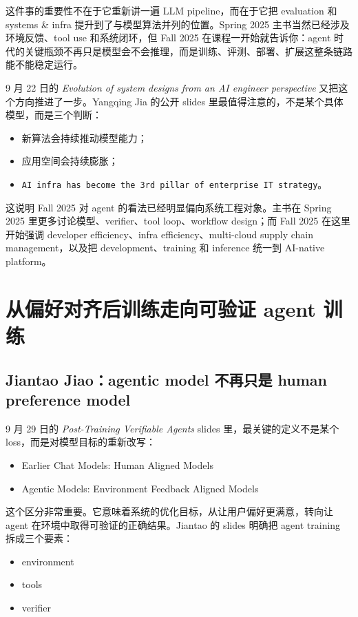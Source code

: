 这件事的重要性不在于它重新讲一遍 LLM pipeline，而在于它把 evaluation 和 systems \& infra 提升到了与模型算法并列的位置。Spring 2025 主书当然已经涉及环境反馈、tool use 和系统闭环，但 Fall 2025 在课程一开始就告诉你：agent 时代的关键瓶颈不再只是模型会不会推理，而是训练、评测、部署、扩展这整条链路能不能稳定运行。

9 月 22 日的 \emph{Evolution of system designs from an AI engineer perspective} 又把这个方向推进了一步。Yangqing Jia 的公开 slides 里最值得注意的，不是某个具体模型，而是三个判断：

\begin{itemize}
\item 新算法会持续推动模型能力；
\item 应用空间会持续膨胀；
\item \texttt{AI infra has become the 3rd pillar of enterprise IT strategy}。
\end{itemize}

这说明 Fall 2025 对 agent 的看法已经明显偏向系统工程对象。主书在 Spring 2025 里更多讨论模型、verifier、tool loop、workflow design；而 Fall 2025 在这里开始强调 developer efficiency、infra efficiency、multi-cloud supply chain management，以及把 development、training 和 inference 统一到 AI-native platform。

\section{从偏好对齐后训练走向可验证 agent 训练}

\subsection{Jiantao Jiao：agentic model 不再只是 human preference model}

9 月 29 日的 \emph{Post-Training Verifiable Agents} slides 里，最关键的定义不是某个 loss，而是对模型目标的重新改写：

\begin{itemize}
\item Earlier Chat Models: Human Aligned Models
\item Agentic Models: Environment Feedback Aligned Models
\end{itemize}

这个区分非常重要。它意味着系统的优化目标，从让用户偏好更满意，转向让 agent 在环境中取得可验证的正确结果。Jiantao 的 slides 明确把 agent training 拆成三个要素：

\begin{itemize}
\item environment
\item tools
\item verifier
\end{itemize}


